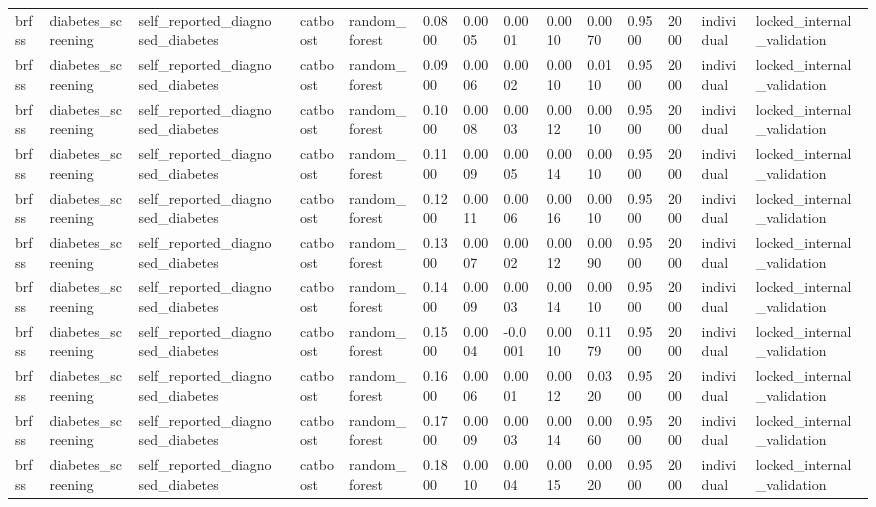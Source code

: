\begin{tabular}{lllllllllllllll}
brfss & diabetes\_screening & self\_reported\_diagnosed\_diabetes &  & catboost & random\_forest & 0.0800 & 0.0005 & 0.0001 & 0.0010 & 0.0070 & 0.9500 & 2000 & individual & locked\_internal\_validation \\
brfss & diabetes\_screening & self\_reported\_diagnosed\_diabetes &  & catboost & random\_forest & 0.0900 & 0.0006 & 0.0002 & 0.0010 & 0.0110 & 0.9500 & 2000 & individual & locked\_internal\_validation \\
brfss & diabetes\_screening & self\_reported\_diagnosed\_diabetes &  & catboost & random\_forest & 0.1000 & 0.0008 & 0.0003 & 0.0012 & 0.0010 & 0.9500 & 2000 & individual & locked\_internal\_validation \\
brfss & diabetes\_screening & self\_reported\_diagnosed\_diabetes &  & catboost & random\_forest & 0.1100 & 0.0009 & 0.0005 & 0.0014 & 0.0010 & 0.9500 & 2000 & individual & locked\_internal\_validation \\
brfss & diabetes\_screening & self\_reported\_diagnosed\_diabetes &  & catboost & random\_forest & 0.1200 & 0.0011 & 0.0006 & 0.0016 & 0.0010 & 0.9500 & 2000 & individual & locked\_internal\_validation \\
brfss & diabetes\_screening & self\_reported\_diagnosed\_diabetes &  & catboost & random\_forest & 0.1300 & 0.0007 & 0.0002 & 0.0012 & 0.0090 & 0.9500 & 2000 & individual & locked\_internal\_validation \\
brfss & diabetes\_screening & self\_reported\_diagnosed\_diabetes &  & catboost & random\_forest & 0.1400 & 0.0009 & 0.0003 & 0.0014 & 0.0010 & 0.9500 & 2000 & individual & locked\_internal\_validation \\
brfss & diabetes\_screening & self\_reported\_diagnosed\_diabetes &  & catboost & random\_forest & 0.1500 & 0.0004 & -0.0001 & 0.0010 & 0.1179 & 0.9500 & 2000 & individual & locked\_internal\_validation \\
brfss & diabetes\_screening & self\_reported\_diagnosed\_diabetes &  & catboost & random\_forest & 0.1600 & 0.0006 & 0.0001 & 0.0012 & 0.0320 & 0.9500 & 2000 & individual & locked\_internal\_validation \\
brfss & diabetes\_screening & self\_reported\_diagnosed\_diabetes &  & catboost & random\_forest & 0.1700 & 0.0009 & 0.0003 & 0.0014 & 0.0060 & 0.9500 & 2000 & individual & locked\_internal\_validation \\
brfss & diabetes\_screening & self\_reported\_diagnosed\_diabetes &  & catboost & random\_forest & 0.1800 & 0.0010 & 0.0004 & 0.0015 & 0.0020 & 0.9500 & 2000 & individual & locked\_internal\_validation \\

\end{tabular}
